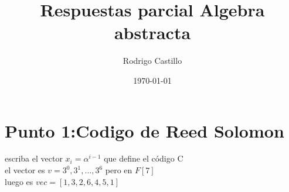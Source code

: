 \documentclass[10pt,a4paper]{article} %
\begin{document}
    \title{{  Respuestas parcial Algebra abstracta  }}
    \author{{Rodrigo Castillo}}
    \date{\today}

    \maketitle


    \section{Punto 1:Codigo de Reed Solomon}
    escriba el vector $x_i = \alpha ^{i-1} $ que define el código C
    \\
    el vector es $v = 3 ^{0} , 3 ^{1} , ... , 3 ^{6}   $ pero en $F[7]$
    \\
    luego es $ vec = [ 1, 3 ,2 , 6 , 4, 5, 1]$
\end{document}
